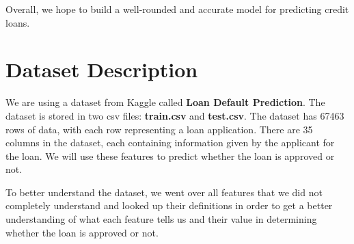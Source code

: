 \documentclass[sigplan]{acmart}
\begin{document}
Overall, we hope to build a well-rounded and accurate model for predicting credit loans.

\section{Dataset Description}
We are using a dataset from Kaggle called \textbf{Loan Default Prediction}. The dataset is stored in two csv files: \textbf{train.csv} and \textbf{test.csv}. The dataset has 67463 rows of data, with each row representing a loan application. There are 35 columns in the dataset, each containing information given by the applicant for the loan. We will use these features to predict whether the loan is approved or not.

To better understand the dataset, we went over all features that we did not completely understand and looked up their definitions in order to get a better understanding of what each feature tells us and their value in determining whether the loan is approved or not.
\end{document}

